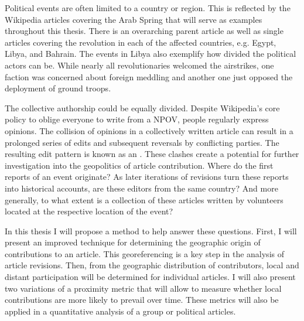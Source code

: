 Political events are often limited to a country or region. 
This is reflected by the Wikipedia articles covering the Arab Spring that will serve as examples throughout this thesis.
There is an overarching parent article  as well as single articles covering the revolution in each of the affected countries, e.g. Egypt, Libya, and Bahrain.
The events in Libya also exemplify how divided the political actors can be.
While nearly all revolutionaries welcomed the airstrikes, one faction was concerned about foreign meddling and another one just opposed the deployment of ground troops.\cite{econ18290470}

The collective authorship could be equally divided.
Despite Wikipedia's core policy to oblige everyone to write from a \ac{NPOV}, people regularly express opinions. 
The collision of opinions in a collectively written article can result in a prolonged series of edits and subsequent reversals by conflicting parties. 
The resulting edit pattern is known as an .\cite{suh2007us}
These clashes create a potential for further investigation into the geopolitics of article contribution.
Where do the first reports of an event originate?
As later iterations of revisions turn these reports into historical accounts, are these editors from the same country?
And more generally, to what extent is a collection of these articles written by volunteers located at the respective location of the event?

In this thesis I will propose a method to help answer these questions.
First, I will present an improved technique for determining the geographic origin of contributions to an article.
This georeferencing is a key step in the analysis of article revisions.
Then, from the geographic distribution of contributors, local and distant participation will be determined for individual articles.
I will also present two variations of a proximity metric that will allow to measure whether local contributions are more likely to prevail over time. 
These metrics will also be applied in a quantitative analysis of a group or political articles.


